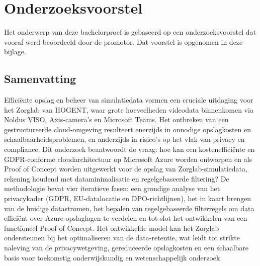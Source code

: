 \documentclass[dutch,dit,thesis]{hogentreport}
\begin{document}





%

%




\appendix

\chapter{Onderzoeksvoorstel}

Het onderwerp van deze bachelorproef is gebaseerd op een onderzoeksvoorstel dat vooraf werd beoordeeld door de promotor. Dat voorstel is opgenomen in deze bijlage.

\section*{Samenvatting}

Efficiënte opslag en beheer van simulatiedata vormen een cruciale uitdaging voor het Zorglab van HOGENT, waar grote hoeveelheden videodata binnenkomen via Noldus VISO, Axis-camera's en Microsoft Teams. Het ontbreken van een gestructureerde cloud-omgeving resulteert enerzijds in onnodige opslagkosten en schaalbaarheidsproblemen, en anderzijds in risico's op het vlak van privacy en compliance. Dit onderzoek beantwoordt de vraag: hoe kan een kostenefficiënte en GDPR-conforme cloudarchitectuur op Microsoft Azure worden ontworpen en als Proof of Concept worden uitgewerkt voor de opslag van Zorglab-simulatiedata, rekening houdend met dataminimalisatie en regelgebaseerde filtering? De methodologie bevat vier iteratieve fasen: een grondige analyse van het privacykader (GDPR, EU-datalocatie en DPO-richtlijnen), het in kaart brengen van de huidige datastromen, het bepalen van regelgebaseerde filterregels om data efficiënt over Azure-opslaglagen te verdelen en tot slot het ontwikkelen van een functioneel Proof of Concept. Het ontwikkelde model kan het Zorglab ondersteunen bij het optimaliseren van de data-retentie, wat leidt tot strikte naleving van de privacywetgeving, gereduceerde opslagkosten en een schaalbare basis voor toekomstig onderwijskundig en wetenschappelijk onderzoek.

\end{document}
